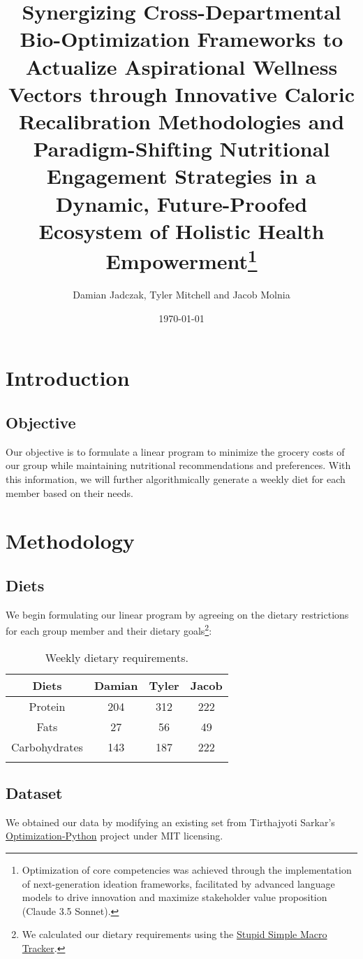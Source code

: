 \documentclass[12pt, english]{report}
\title{Synergizing Cross-Departmental Bio-Optimization Frameworks to Actualize Aspirational Wellness Vectors through Innovative Caloric Recalibration Methodologies and Paradigm-Shifting Nutritional Engagement Strategies in a Dynamic, Future-Proofed Ecosystem of Holistic Health Empowerment\footnote{Optimization of core competencies was achieved through the implementation of next-generation ideation frameworks, facilitated by advanced language models to drive innovation and maximize stakeholder value proposition (Claude 3.5 Sonnet).}}
\author{Damian Jadczak, Tyler Mitchell and Jacob Molnia}
\date\today
\begin{document}
\maketitle
\tableofcontents
\pagebreak
\chapter{Introduction}
\vspace*{-1in}
\section{Objective}
Our objective is to formulate a linear program to minimize the grocery costs of our group while maintaining nutritional recommendations and preferences. With this information, we will further algorithmically generate a weekly diet for each member based on their needs.
\chapter{Methodology}
\vspace*{-1in}
\section{Diets}
We begin formulating our linear program by agreeing on the dietary restrictions for each group member and their dietary goals\footnote{We calculated our dietary requirements using the \href{https://apps.apple.com/us/app/stupid-simple-macro-tracker/id1210995590}{Stupid Simple Macro Tracker}.}:
\begin{table}[H]
    \centering
    \caption[short]{Weekly dietary requirements.}
    \begin{tabular}{cccc}
        \toprule
        Diets & Damian & Tyler & Jacob\\ 
        \midrule
        Protein & 204 &312 & 222 \\ 
        Fats &27 &56 & 49\\ 
        Carbohydrates &143 &187 & 222 \\
    \bottomrule
    \label{tab:diet}
    \end{tabular}
\end{table}
\section{Dataset}
We obtained our data by modifying an existing set from Tirthajyoti Sarkar's \href{https://github.com/tirthajyoti/Optimization-Python/blob/master/Data/diet.xls}{Optimization-Python} project under MIT licensing.
\pagebreak
\printbibliography
\end{document}
